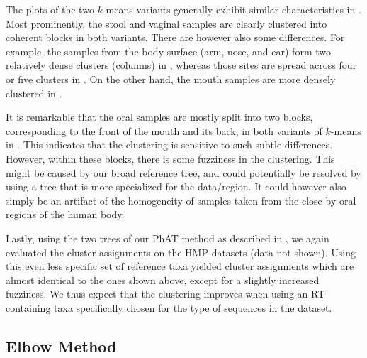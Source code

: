 The plots of the two $k$-means variants generally exhibit similar characteristics in .
Most prominently, the stool and vaginal samples are clearly clustered into coherent blocks in both variants.
There are however also some differences.
For example, the samples from the body surface (arm, nose, and ear)
form two relatively dense clusters (columns) in ,
whereas those sites are spread across four or five clusters in .
On the other hand, the mouth samples are more densely clustered in .

It is remarkable that the oral samples are mostly split into two blocks,
corresponding to the front of the mouth and its back, in both variants of $k$-means in .
This indicates that the clustering is sensitive to such subtle differences.
However, within these blocks, there is some fuzziness in the clustering.
This might be caused by our broad reference tree,
and could potentially be resolved by using a tree that is more specialized for the data/region.
It could however also simply be an artifact of the homogeneity of samples
taken from the close-by oral regions of the human body.

Lastly, using the two  trees of our \ac{PhAT} method
as described in ,
we again evaluated the cluster assignments on the \ac{HMP} datasets (data not shown).
Using this even less specific set of reference taxa yielded cluster assignments
which are almost identical to the ones shown above, except for a slightly increased fuzziness.
We thus expect that the clustering improves when using an \ac{RT}
containing taxa specifically chosen for the type of sequences in the dataset.


\subsection{Elbow Method}
\label{ch:Clustering:sec:Results:sub:ElbowMethod}

